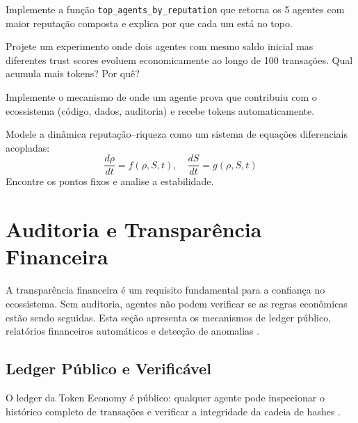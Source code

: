 \begin{exercicio}
Implemente a função \lstinline{top_agents_by_reputation} que
retorna os 5 agentes com maior reputação composta e explica
por que cada um está no topo.
\end{exercicio}

\begin{exercicio}
Projete um experimento onde dois agentes com mesmo saldo inicial
mas diferentes trust scores evoluem economicamente ao longo de
100 transações. Qual acumula mais tokens? Por quê?
\end{exercicio}

\begin{exercicio}
Implemente o mecanismo de  onde
um agente prova que contribuiu com o ecossistema (código, dados,
auditoria) e recebe tokens automaticamente.
\end{exercicio}

\begin{exercicio}
Modele a dinâmica reputação--riqueza como um sistema de equações
diferenciais acopladas:
\[
\frac{d\rho}{dt} = f(\rho, S, t), \quad \frac{dS}{dt} = g(\rho, S, t)
\]
Encontre os pontos fixos e analise a estabilidade.
\end{exercicio}

\section{Auditoria e Transparência Financeira}
\label{sec:auditoria-financeira}
\nivelintermediario

A transparência financeira é um requisito fundamental para a
confiança no ecossistema. Sem auditoria, agentes não podem
verificar se as regras econômicas estão sendo seguidas. Esta
seção apresenta os mecanismos de ledger público, relatórios
financeiros automáticos e detecção de anomalias \cite{opencode2026token}.

\subsection{Ledger Público e Verificável}

O ledger da Token Economy é público: qualquer agente pode
inspecionar o histórico completo de transações e verificar a
integridade da cadeia de hashes \cite{opencode2026token,
nakamoto2008bitcoin}.

